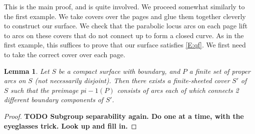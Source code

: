 \documentclass[12pt]{amsart}
\newtheorem{lemma}[theorem]{Lemma}
\theoremstyle{definition}
\theoremstyle{remark}
\begin{document}
This is the main proof, and is quite involved. We proceed somewhat similarly to
the first example. We take covers over the pages and glue them together
cleverly to construct our surface. We check that the parabolic locus arcs on
each page lift to arcs on these covers that do not connect up to form a closed
curve. As in the first example, this suffices to prove that our surface
satisfies \eqref{E:qf}. We first need to take the correct cover over each page.

\begin{lemma}

Let $S$ be a compact surface with boundary, and $P$ a finite set of proper arcs
on $S$ (not necessarily disjoint).  Then there exists a finite-sheeted cover
$S'$ of $S$ such that the preimage $pi-1(P)$ consists of arcs each of which
connects 2 different boundary components of $S'$.

\end{lemma}

\begin{proof}

{\bf TODO Subgroup separability again. Do one at a time, with the eyeglasses
trick.  Look up and fill in.}

\end{proof}
\end{document}
